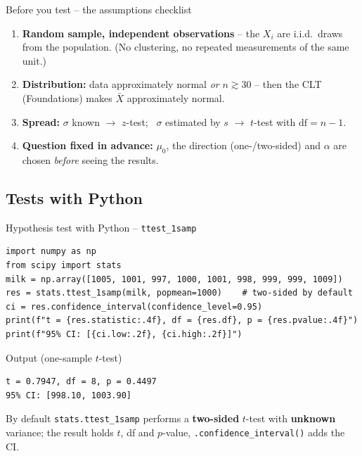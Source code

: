 \documentclass[aspectratio=169,11pt]{beamer}
\begin{document}
\begin{frame}{Before you test -- the assumptions checklist}
  \begin{enumerate}\setlength{\itemsep}{5pt}
    \item \textbf{Random sample, independent observations} -- the $X_i$ are
          i.i.d.\ draws from the population. (No clustering, no repeated
          measurements of the same unit.)
    \item \textbf{Distribution:} data approximately normal \emph{or}
          $n\gtrsim 30$ -- then the CLT (Foundations) makes $\bar X$
          approximately normal.
    \item \textbf{Spread:} $\sigma$ known $\to$ $z$-test; \ $\sigma$ estimated
          by $s$ $\to$ $t$-test with $\mathrm{df}=n-1$.
    \item \textbf{Question fixed in advance:} $\mu_0$, the direction
          (one-/two-sided) and $\alpha$ are chosen \emph{before} seeing the
          results.
  \end{enumerate}
\end{frame}

\subsection{Tests with Python}

\begin{frame}[fragile]{Hypothesis test with Python -- \texttt{ttest\_1samp}}
\begin{lstlisting}
import numpy as np
from scipy import stats
milk = np.array([1005, 1001, 997, 1000, 1001, 998, 999, 999, 1009])
res = stats.ttest_1samp(milk, popmean=1000)    # two-sided by default
ci = res.confidence_interval(confidence_level=0.95)
print(f"t = {res.statistic:.4f}, df = {res.df}, p = {res.pvalue:.4f}")
print(f"95% CI: [{ci.low:.2f}, {ci.high:.2f}]")
\end{lstlisting}
  \begin{block}{Output (one-sample $t$-test)}
\begin{lstlisting}[style=Pyout]
t = 0.7947, df = 8, p = 0.4497
95% CI: [998.10, 1003.90]
\end{lstlisting}
  \end{block}
  \footnotesize By default \texttt{stats.ttest\_1samp} performs a
  \textbf{two-sided} $t$-test with \textbf{unknown} variance; the result holds
  $t$, df and $p$-value, \texttt{.confidence\_interval()} adds the CI.
\end{frame}
\end{document}
